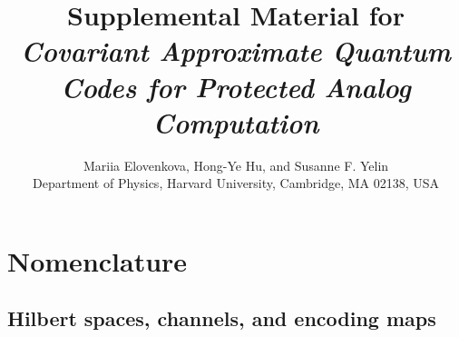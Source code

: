 \documentclass[11pt,letterpaper]{article}
\theoremstyle{plain}
\theoremstyle{plain}
\theoremstyle{plain}
\theoremstyle{plain}
\theoremstyle{plain}
\theoremstyle{plain}
\theoremstyle{plain}
\theoremstyle{definition}
\theoremstyle{plain}
\begin{document}
\title{Supplemental Material for\\[0.3em]
\textit{Covariant Approximate Quantum Codes for Protected Analog Computation}}

\author{Mariia Elovenkova, Hong-Ye Hu, and Susanne F. Yelin\\[0.3em]
\normalsize Department of Physics, Harvard University, Cambridge, MA 02138, USA}

\date{}

\maketitle

\tableofcontents
\clearpage

\section*{Nomenclature}\label{sec:notation}
\subsection*{Hilbert spaces, channels, and encoding maps}
\end{document}
